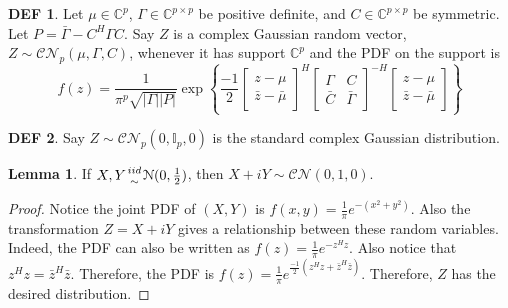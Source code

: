 \documentclass{article}
\theoremstyle{definition}\newtheorem{definition}{DEF}
\theoremstyle{lemma}\newtheorem{lemma}{Lemma}
\theoremstyle{corrolary}\newtheorem{corrolary}{Cor}
\begin{document}
\begin{definition}
Let $\mu \in \mathbb{C}^p$, $\Gamma \in \mathbb{C}^{p \times p}$ be positive definite, and $C \in \mathbb{C}^{p \times p}$ be symmetric.
Let $P=\bar{\Gamma} - C^H \Gamma C$.
Say $Z$ is a complex Gaussian random vector, $Z \sim \mathcal{CN}_p(\mu, \Gamma, C)$, whenever it has support $\mathbb{C}^p$ and the PDF on the support is
\begin{equation}
f(z) = \frac{1}{\pi^p \sqrt{|\Gamma||P|}}\exp \left\{ \frac{-1}{2} 
\begin{bmatrix}
z - \mu \\
\bar{z} - \bar{\mu}
\end{bmatrix}^H
\begin{bmatrix}
\Gamma & C \\
\bar{C} & \bar{\Gamma}
\end{bmatrix}^{-H}
\begin{bmatrix}
z - \mu \\
\bar{z} - \bar{\mu}
\end{bmatrix}
\right\}
\end{equation}
\end{definition}

\begin{definition}
Say $Z \sim \mathcal{CN}_p(0, \mathbb{I}_p, 0)$ is the standard complex Gaussian distribution.
\end{definition}

\begin{lemma}
If $X,Y {iid \atop \sim} \mathcal{N}(0, \frac{1}{2})$, then $X+iY\sim \mathcal{CN}(0, 1, 0)$.
\end{lemma}
\begin{proof}
Notice the joint PDF of $(X,Y)$ is $f(x,y)=\frac{1}{\pi} e^{-(x^2 +y^2)}$.
Also the transformation $Z=X+iY$ gives a relationship between these random variables.
Indeed, the PDF can also be written as $f(z)=\frac{1}{\pi} e^{-z^H z}$.
Also notice that $z^H z=\bar{z}^H \bar{z}$.
Therefore, the PDF is $f(z)=\frac{1}{\pi} e^{\frac{-1}{2}(z^H z + \bar{z}^H \bar{z})}$.
Therefore, $Z$ has the desired distribution.
\end{proof}
\end{document}
